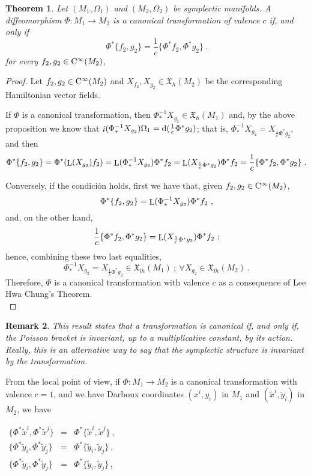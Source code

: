 \documentclass[12pt]{report}
\newtheorem{teor}{Theorem}[chapter]
\newtheorem{remark}[teor]{Remark}
\def\qed{\ifvmode\removelastskip\fi
{\unskip\nobreak\hfil\penalty50\hbox{}\nobreak\hfil
\hbox{\vrule height1.2ex width1.2ex}\parfillskip=0pt
\finalhyphendemerits=0 \par\smallskip}}
\def\vf{\mathfrak X}
\def\d{{\rm d}}
\def\Lie{\mathop{\rm L}\nolimits}
\def\inn{\mathop{i}\nolimits}
\def\Cinfty{{\rm C}^\infty}
\begin{document}
\begin{teor}
Let $(M_1,\Omega_1)$ and $(M_2,\Omega_2)$ be
symplectic manifolds. A diffeomorphism 
$\Phi :M_1\to M_2$ is a canonical transformation of valence $c$
if, and only if 
$$
\Phi^*\{ f_2,g_2 \} = \frac{1}{c}\{ \Phi^*f_2,\Phi^*g_2 \} \ .
$$
for every $f_2,g_2 \in \Cinfty (M_2)$,
\end{teor}
\begin{proof}
Let $f_{2},g_2 \in \Cinfty (M_2)$ and
$X_{f_{2}},X_{g_2} \in \vf_{h}(M_2)$ be the corresponding Hamiltonian vector fields.

If $\Phi$ is a canonical transformation, then $\Phi_*^{-1}X_{g_2} \in \vf_{h}(M_1)$
and, by the above proposition we know that
$\inn (\Phi_*^{-1}X_{g_2})\Omega_1 = \d (\frac{1}{c}\Phi^*g_2)$;
that is, $\Phi_*^{-1}X_{g_2} = X_{\frac{1}{c}\Phi^*g_2}$,
and then
$$
\Phi^*\{ f_2,g_2 \} =
\Phi^*(\Lie (X_{g_2})f_2) =
\Lie (\Phi_*^{-1}X_{g_2})\Phi^*f_2
=\Lie (X_{\frac{1}{c}\Phi^*g_2})\Phi^*f_2 =
\frac{1}{c}\{ \Phi^*f_2,\Phi^*g_2 \} \ .
$$

Conversely, if the condici\'on holds, first we have that,
given $f_2,g_2 \in \Cinfty (M_2)$,
$$
\Phi^*\{ f_2,g_2 \} =
\Lie (\Phi_*^{-1}X_{g_2})\Phi^*f_2 \ ,
$$
and, on the other hand,
$$
\frac{1}{c}\{ \Phi^*f_2,\Phi^*g_2 \} =
\Lie (X_{\frac{1}{c}\Phi^*g_2})\Phi^*f_2 \ ;
$$
hence, combining these two last equalities,
$$
\Phi_*^{-1}X_{g_2} = X_{\frac{1}{c}\Phi^*g_2} \in \vf_{lh}(M_1)
\ ; \ \forall X_{g_2} \in \vf_{lh}(M_2) \ .
$$
Therefore, $\Phi$ is a canonical transformation
with valence $c$ as a consequence of Lee Hwa Chung's Theorem.
\\ \qed  \end{proof}

\begin{remark}{\rm 
This result states that a transformation is canonical
if, and only if, 
the Poisson bracket is invariant, up to a multiplicative constant, by its action.
Really, this is an alternative way to say that
the symplectic structure is invariant by the transformation.
}\end{remark}

From the local point of view, if $\Phi:M_{1}\to M_{2}$ is a canonical transformation with valence $c=1$, and we have Darboux coordinates
$(x^i,y_i)$ in $M_1$ and $(\tilde  x^i,\tilde  y_i)$ in $M_2$, we have

\hspace{40mm}\(\begin{array}{ccccccc}
\{\Phi^*\tilde  x^i,\Phi^*\tilde  x^j\}&=&\Phi^*\{\tilde  x^i,\tilde  x^j\}  \ , \\
\{\Phi^*\tilde  y_i,\Phi^*\tilde  y_j\}&=&\Phi^*\{\tilde  y_i,\tilde  y_j\}  \ ,\\
\{\Phi^*\tilde  y_i,\Phi^*\tilde  y_j\} &=&\Phi^*\{\tilde  y_i,\tilde  y_j\}   \,,
\end{array}\)
\end{document}
